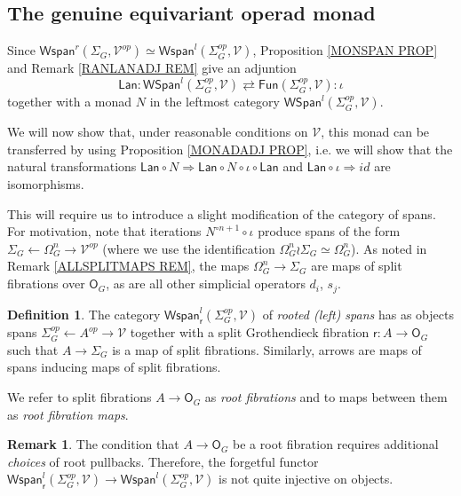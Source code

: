 \documentclass[a4paper,10pt
,draft
]{article}%
\numberwithin{equation}{section}
\numberwithin{figure}{section}
\theoremstyle{definition} %
\newtheorem{definition}[equation]{Definition}%
\newtheorem{remark}[equation]{Remark}%
\newcommand{\F}{\ensuremath{\mathcal F}}
\newcommand{\1}{\ensuremath{\mathbbm 1}}%
\begin{document}
\renewcommand{\F}{\mathbb{F}}

\subsection{The genuine equivariant operad monad} \label{FGMON SEC}


Since 
$\mathsf{Wspan}^r(\Sigma_G,\mathcal{V}^{op}) \simeq 
\mathsf{Wspan}^l(\Sigma_G^{op},\mathcal{V})$,
Proposition \ref{MONSPAN PROP} and Remark \ref{RANLANADJ REM} give an adjuntion
\[
	\mathsf{Lan} \colon
	\mathsf{WSpan}^l(\Sigma^{op}_G, \mathcal{V})
		\rightleftarrows
	\mathsf{Fun}(\Sigma^{op}_G, \mathcal{V})
	\colon \iota
\]
together with a monad $N$ in the leftmost category $\mathsf{WSpan}^l(\Sigma^{op}_G, \mathcal{V})$.


We will now show that,
under reasonable conditions on $\mathcal{V}$,
this monad can be transferred by using 
Proposition \ref{MONADADJ PROP},
i.e. we will show that the natural transformations 
$
\mathsf{Lan} \circ N \Rightarrow \mathsf{Lan} \circ N \circ \iota \circ \mathsf{Lan}
$
and
$\mathsf{Lan} \circ \iota \Rightarrow id$
are isomorphisms.

This will require us to introduce a slight modification of the category of spans.
For motivation, note that iterations
$N^{\circ n+1} \circ \iota$ produce spans of the form
$\Sigma_G \leftarrow \Omega_G^{n} \to \mathcal{V}^{op}$
(where we use the identification $\Omega_G^{n} \wr \Sigma_G \simeq \Omega_G^{n}$). 
As noted in Remark \ref{ALLSPLITMAPS REM}, the maps 
$\Omega_G^{n} \to \Sigma_G$ are maps of split fibrations over $\mathsf{O}_G$, as are all other simplicial operators $d_i$, $s_j$.

\begin{definition}
The category $\mathsf{Wspan}^l_{\mathsf{r}}(\Sigma_G^{op},\mathcal{V})$ of \textit{rooted (left) spans}
has as objects spans
$\Sigma_G^{op} \leftarrow A^{op} \to \mathcal{V}$
together with a split Grothendieck fibration 
$\mathsf{r} \colon A \to \mathsf{O}_G$
such that $A \to \Sigma_G$ is a map of split fibrations.
%
Similarly, arrows are maps of spans inducing maps of split fibrations.
\end{definition}

We refer to split fibrations $A \to \mathsf{O}_G$
as \textit{root fibrations}
and to maps between them as \textit{root fibration maps}.

\begin{remark}
The condition that $A \to \mathsf{O}_G$
be a root fibration requires additional \textit{choices} of root pullbacks. Therefore, the forgetful functor 
$\mathsf{Wspan}^l_{\mathsf{r}}(\Sigma_G^{op},\mathcal{V})
\to
\mathsf{Wspan}^l(\Sigma_G^{op},\mathcal{V})$
is not quite injective on objects.
\end{remark}
\end{document}
